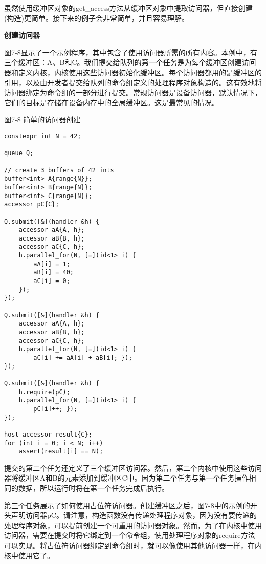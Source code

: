 虽然使用缓冲区对象的get\_access方法从缓冲区对象中提取访问器，但直接创建(构造)更简单。接下来的例子会非常简单，并且容易理解。\par

\hspace*{\fill} \par %
\textbf{创建访问器}

图7-8显示了一个示例程序，其中包含了使用访问器所需的所有内容。本例中，有三个缓冲区：A、B和C。我们提交给队列的第一个任务是为每个缓冲区创建访问器和定义内核，内核使用这些访问器初始化缓冲区。每个访问器都用的是缓冲区的引用，以及由开发者提交给队列的命令组定义的处理程序对象构造的。这有效地将访问器绑定为命令组的一部分进行提交。常规访问器是设备访问器，默认情况下，它们的目标是存储在设备内存中的全局缓冲区。这是最常见的情况。\par

\hspace*{\fill} \par %
图7-8 简单的访问器创建
\begin{lstlisting}[caption={}]
constexpr int N = 42;

queue Q;

// create 3 buffers of 42 ints
buffer<int> A{range{N}};
buffer<int> B{range{N}};
buffer<int> C{range{N}};
accessor pC{C};

Q.submit([&](handler &h) {
	accessor aA{A, h};
	accessor aB{B, h};
	accessor aC{C, h};
	h.parallel_for(N, [=](id<1> i) {
		aA[i] = 1;
		aB[i] = 40;
		aC[i] = 0;
	});
});

Q.submit([&](handler &h) {
	accessor aA{A, h};
	accessor aB{B, h};
	accessor aC{C, h};
	h.parallel_for(N, [=](id<1> i) {
		aC[i] += aA[i] + aB[i]; });
});

Q.submit([&](handler &h) {
	h.require(pC);
	h.parallel_for(N, [=](id<1> i) {
		pC[i]++; });
});

host_accessor result{C};
for (int i = 0; i < N; i++)
	assert(result[i] == N);
\end{lstlisting}

提交的第二个任务还定义了三个缓冲区访问器。然后，第二个内核中使用这些访问器将缓冲区A和B的元素添加到缓冲区C中。因为第二个任务与第一个任务操作相同的数据，所以运行时将在第一个任务完成后执行。\par

第三个任务展示了如何使用占位符访问器。创建缓冲区之后，图7-8中的示例的开头声明访问器pC。请注意，构造函数没有传递处理程序对象，因为没有要传递的处理程序对象，可以提前创建一个可重用的访问器对象。然而，为了在内核中使用访问器，需要在提交时将它绑定到一个命令组，使用处理程序对象的require方法可以实现。将占位符访问器绑定到命令组时，就可以像使用其他访问器一样，在内核中使用它了。\par

